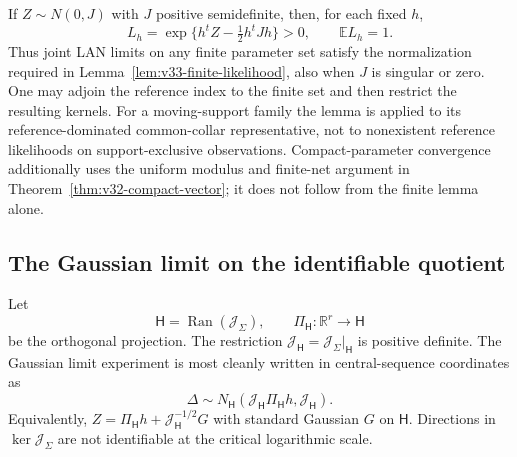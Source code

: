 \begin{remark}
\label{rem:v33-gaussian-normalization}
If \(Z\sim N(0,J)\) with \(J\) positive semidefinite, then, for each
fixed \(h\),
\[
 L_h=\exp\{h^tZ-\tfrac12h^tJh\}>0,
 \qquad \mathbb E L_h=1.
\]
Thus joint LAN limits on any finite parameter set satisfy the
normalization required in Lemma~\ref{lem:v33-finite-likelihood}, also
when \(J\) is singular or zero.  One may adjoin the reference index to
the finite set and then restrict the resulting kernels.  For a
moving-support family the lemma is applied to its reference-dominated
common-collar representative, not to nonexistent reference likelihoods
on support-exclusive observations.  Compact-parameter convergence
additionally uses the uniform modulus and finite-net argument in
Theorem~\ref{thm:v32-compact-vector}; it does not follow
from the finite lemma alone.
\end{remark}

\subsection{The Gaussian limit on the identifiable quotient}

Let
\begin{equation}\label{eq:v22-identifiable-space}
 \mathsf H=\operatorname{Ran}(\mathcal J_\Sigma),\qquad
 \Pi_{\mathsf H}:\mathbb R^r\to\mathsf H
\end{equation}
be the orthogonal projection.  The restriction
$\mathcal J_{\mathsf H}=\mathcal J_\Sigma|_{\mathsf H}$ is positive definite.
The Gaussian limit experiment is most cleanly written in central-sequence
coordinates as
\begin{equation}\label{eq:v22-gaussian-central-experiment}
          \Delta\sim N_{\mathsf H}(\mathcal J_{\mathsf H}
                   \Pi_{\mathsf H}h,\mathcal J_{\mathsf H}).
\end{equation}
Equivalently,
$Z=\Pi_{\mathsf H}h+\mathcal J_{\mathsf H}^{-1/2}G$ with standard Gaussian
$G$ on $\mathsf H$.  Directions in $\ker\mathcal J_\Sigma$ are not
identifiable at the critical logarithmic scale.

